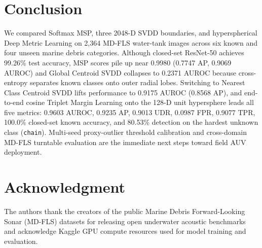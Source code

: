 \documentclass[conference]{IEEEtran}
\begin{document}
\section{Conclusion}
\label{sec:conclusion}

We compared Softmax MSP, three 2048-D SVDD boundaries, and hyperspherical Deep Metric Learning on 2,364 MD-FLS water-tank images across six known and four unseen marine debris categories. Although closed-set ResNet-50 achieves 99.26\% test accuracy, MSP scores pile up near 0.9980 (0.7747 AP, 0.9069 AUROC) and Global Centroid SVDD collapses to 0.2371 AUROC because cross-entropy separates known classes onto outer radial lobes. Switching to Nearest Class Centroid SVDD lifts performance to 0.9175 AUROC (0.8568 AP), and end-to-end cosine Triplet Margin Learning onto the 128-D unit hypersphere leads all five metrics: 0.9603 AUROC, 0.9235 AP, 0.9013 UDR, 0.0987 FPR, 0.9077 TPR, 100.0\% closed-set known accuracy, and 80.53\% detection on the hardest unknown class (\texttt{chain}). Multi-seed proxy-outlier threshold calibration and cross-domain MD-FLS turntable evaluation are the immediate next steps toward field AUV deployment.

\section*{Acknowledgment}
The authors thank the creators of the public Marine Debris Forward-Looking Sonar (MD-FLS) datasets for releasing open underwater acoustic benchmarks and acknowledge Kaggle GPU compute resources used for model training and evaluation.



\end{document}
